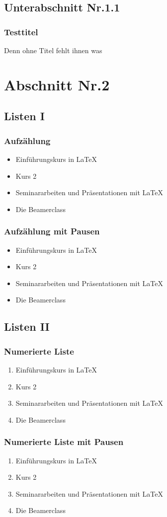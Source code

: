 \documentclass[aspectratio=1610, compress, bigger]{beamer}
\begin{document}
\subsection{Unterabschnitt Nr.1.1  }
\begin{frame}\frametitle{Testtitel}
Denn ohne Titel fehlt ihnen was
\end{frame}

\section{Abschnitt Nr.2} 
\subsection{Listen I}
\begin{frame}\frametitle{Aufz\"ahlung}
\begin{itemize}
\item Einf\"uhrungskurs in \LaTeX  
\item Kurs 2  
\item Seminararbeiten und Pr\"asentationen mit \LaTeX 
\item Die Beamerclass 
\end{itemize} 
\end{frame}

\begin{frame}\frametitle{Aufz\"ahlung mit Pausen}
\begin{itemize}
\item  Einf\"uhrungskurs in \LaTeX \pause 
\item  Kurs 2 \pause 
\item  Seminararbeiten und Pr\"asentationen mit \LaTeX \pause 
\item  Die Beamerclass
\end{itemize} 
\end{frame}

\backgroundviolet

\subsection{Listen II}
\begin{frame}\frametitle{Numerierte Liste}
\begin{enumerate}
\item  Einf\"uhrungskurs in \LaTeX 
\item  Kurs 2
\item  Seminararbeiten und Pr\"asentationen mit \LaTeX 
\item  Die Beamerclass
\end{enumerate}
\end{frame}
\begin{frame}\frametitle{Numerierte Liste mit Pausen}
\begin{enumerate}
\item  Einf\"uhrungskurs in \LaTeX \pause 
\item  Kurs 2 \pause 
\item  Seminararbeiten und Pr\"asentationen mit \LaTeX \pause 
\item  Die Beamerclass
\end{enumerate}
\end{frame}
\end{document}
